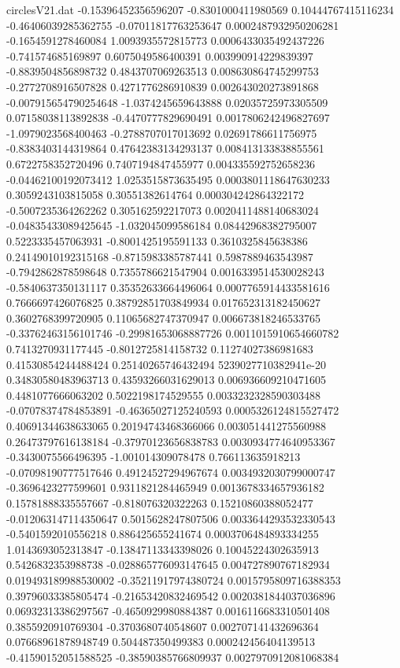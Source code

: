 \begin{filecontents}{circlesV21.dat}
-0.15396452356596207	-0.8301000411980569	0.10444767415116234
-0.46406039285362755	-0.07011817763253647	0.0002487932950206281
-0.1654591278460084	1.0093935572815773	0.0006433035492437226
-0.741574685169897	0.6075049586400391	0.003990914229839397
-0.8839504856898732	0.4843707069263513	0.008630864745299753
-0.2772708916507828	0.4271776286910839	0.002643020273891868
-0.007915654790254648	-1.0374245659643888	0.02035725973305509
0.07158038113892838	-0.4470777829690491	0.0017806242496827697
-1.0979023568400463	-0.2788707017013692	0.02691786611756975
-0.8383403144319864	0.47642383134293137	0.008413133838855561
0.6722758352720496	0.7407194847455977	0.004335592752658236
-0.04462100192073412	1.0253515873635495	0.0003801118647630233
0.3059243103815058	0.30551382614764	0.000304242864322172
-0.5007235364262262	0.305162592217073	0.0020411488140683024
-0.04835433089425645	-1.032045099586184	0.08442968382795007
0.5223335457063931	-0.8001425195591133	0.3610325845638386
0.24149010192315168	-0.8715983385787441	0.5987889463543987
-0.7942862878598648	0.7355786621547904	0.0016339514530028243
-0.5840637350131117	0.35352633664496064	0.0007765914433581616
0.7666697426076825	0.38792851703849934	0.017652313182450627
0.3602768399720905	0.11065682747370947	0.006673818246533765
-0.33762463156101746	-0.29981653068887726	0.0011015910654660782
0.7413270931177445	-0.8012725814158732	0.11274027386981683
0.41530854244488424	0.25140265746432494	5239027710382941e-20
0.34830580483963713	0.43593266031629013	0.006936609210471605
0.4481077666063202	0.5022198174529555	0.0033232328590303488
-0.07078374784853891	-0.46365027125240593	0.0005326124815527472
0.40691344638633065	0.20194743468366066	0.003051441275560988
0.26473797616138184	-0.37970123656838783	0.0030934774640953367
-0.3430075566496395	-1.001014309078478	0.766113635918213
-0.07098190777517646	0.49124527294967674	0.0034932030799000747
-0.3696423277599601	0.9311821284465949	0.0013678334657936182
0.15781888335557667	-0.818076320322263	0.15210860388052477
-0.012063147114350647	0.5015628247807506	0.0033644293532330543
-0.5401592010556218	0.886425655241674	0.0003706484893334255
1.0143693052313847	-0.13847113343398026	0.10045224302635913
0.5426832353988738	-0.028865776093147645	0.004727890767182934
0.019493189988530002	-0.35211917974380724	0.0015795809716388353
0.39796033385805474	-0.21653420832469542	0.0020381844037036896
0.06932313386297567	-0.4650929980884387	0.0016116683310501408
0.3855920910769304	-0.3703680740548607	0.002707141432696364
0.07668961878948749	0.504487350499383	0.000242456404139513
-0.41590152051588525	-0.38590385766809937	0.0027970912081068384

\end{filecontents}
